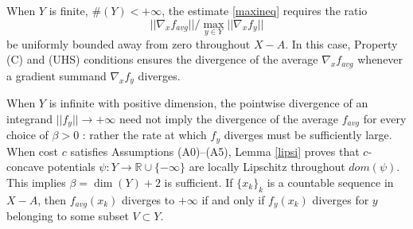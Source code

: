 \documentclass[12pt]{amsart}
\newtheorem{lem}{Lemma}
\theoremstyle{definition}
\theoremstyle{remark}
\newcommand{\bR}{\mathbb{R}}
\begin{document}
When $Y$ is finite, $\#(Y)<+\infty$, the estimate \eqref{maxineq} requires the ratio $$||\nabla_x f_{avg}||/ \max_{y\in Y}||\nabla_x f_y||$$ be uniformly bounded away from zero throughout $X-A$. In this case, Property (C) and (UHS) conditions ensures the divergence of the average $\nabla_x f_{avg}$ whenever a gradient summand $\nabla_x f_y$ diverges. 

When $Y$ is infinite with positive dimension, the pointwise divergence of an integrand $||f_y||\to +\infty$ need not imply the divergence of the average $f_{avg}$ for every choice of $\beta>0$ : rather the rate at which $f_y$ diverges must be sufficiently large. When cost $c$ satisfies Assumptions (A0)--(A5), Lemma \ref{lipsi} proves that $c$-concave potentials $\psi: Y\to \bR \cup \{-\infty\}$ are locally Lipschitz throughout $dom(\psi)$. This implies $\beta =\dim(Y)+2$ is sufficient. If $\{x_k\}_k$ is a countable sequence in $X-A$, then $f_{avg}(x_k)$ diverges to $+\infty$ if and only if $f_y(x_k)$ diverges for $y$ belonging to some subset $V\subset Y$. 













\end{document}
